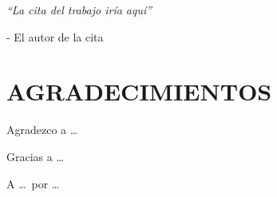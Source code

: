 \documentclass[a4paper, 11pt, spanish, twoside]{article}
\begin{document}
 


\newpage
\thispagestyle{empty}




\newpage
\thispagestyle{empty}

\begin{flushright} %
\vspace*{5cm} %

\textit{“La cita del trabajo iría aquí”} 

\medskip %
- El autor de la cita 

\end{flushright}

\afterpage{\blankpage} %


\newpage
\thispagestyle{plain} %

\section*{AGRADECIMIENTOS} %

Agradezco a \dots

Gracias a \dots

A \dots \ por \dots

\afterpage{\blankpage} %

\newpage
\end{document}
